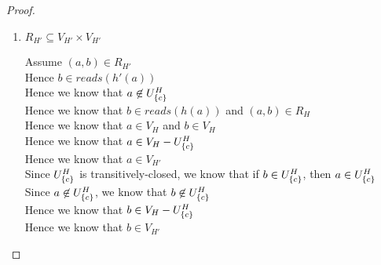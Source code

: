 \begin{proof}
\begin{enumerate}
\item $R_{H'} \subseteq V_{H'} \times V_{H'}$
  \begin{tabbedproof}
    \oo Assume $(a,b) \in R_{H'}$ \\
    \oo Hence $b \in \mathit{reads}(h'(a))$ \\
    \oo Hence we know that $a \not\in U^H_{\{{c}\}}$ \\
    \oo Hence we know that $b \in \mathit{reads}(h(a))$ and $(a,b) \in R_H$\\
    \oo Hence we know that $a \in V_H$ and $b \in V_H$\\
    \oo Hence we know that $a \in V_H - U^H_{\{{c}\}}$ \\
    \oo Hence we know that $a \in V_{H'}$ \\
    \oo Since $U^H_{\{{c}\}}$ is transitively-closed, we know that if $b \in U^H_{\{{c}\}}$, then $a \in U^H_{\{{c}\}}$ \\
    \oo Since $a \not\in U^H_{\{{c}\}}$, we know that $b \not\in U^H_{\{{c}\}}$ \\
    \oo Hence we know that $b \in V_H - U^H_{\{{c}\}}$ \\
    \oo Hence we know that $b \in V_{H'}$ 
  \end{tabbedproof}


\end{enumerate}
\end{proof}
